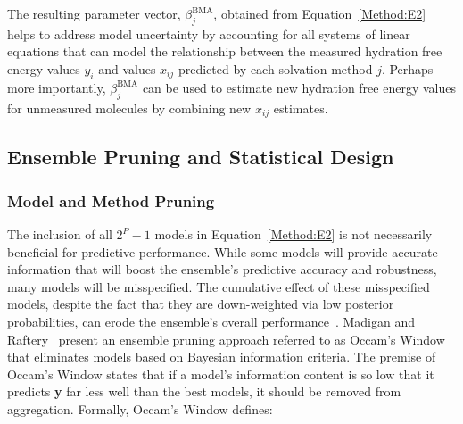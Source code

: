 \documentclass[12pt]{article}
\newcommand{\+}[1]{\ensuremath{\mathbf{#1}}}
\begin{document}

The resulting parameter vector, $\beta_j^{\text{BMA}}$, obtained from Equation~\ref{Method:E2} helps to address model uncertainty by accounting for all systems of linear equations that can model the relationship between the measured hydration free energy values $y_i$ and values $x_{ij}$ predicted by each solvation method $j$. Perhaps more importantly, $\beta_j^{\text{BMA}}$ can be used to estimate new hydration free energy values for unmeasured molecules by combining new $x_{i j}$ estimates.

\subsection{Ensemble Pruning and Statistical Design}
\label{Method:StatEnsemble}

\subsubsection{Model and Method Pruning} 
\label{Method:StatEnsemble:Prune}

The inclusion of all $2^P-1$ models in Equation~\ref{Method:E2} is not necessarily beneficial for predictive performance. While some models will provide accurate information that will boost the ensemble's predictive accuracy and robustness, many models will be misspecified. The cumulative effect of these misspecified models, despite the fact that they are down-weighted via low posterior probabilities, can erode the ensemble's overall performance~\cite{Qian:2015,Martinez-Munoz:2009,Raftery:1998,Onorante:2014,Madigan:1994,Hoeting:1999, Morales-Casique:2010}. Madigan and Raftery~\cite{Madigan:1994} present an ensemble pruning approach referred to as Occam's Window that eliminates models based on Bayesian information criteria. The premise of Occam's Window states that if a model's information content is so low that it predicts \textbf{y} far less well than the best models, it should be removed from aggregation. Formally, Occam's Window defines:
\end{document}
